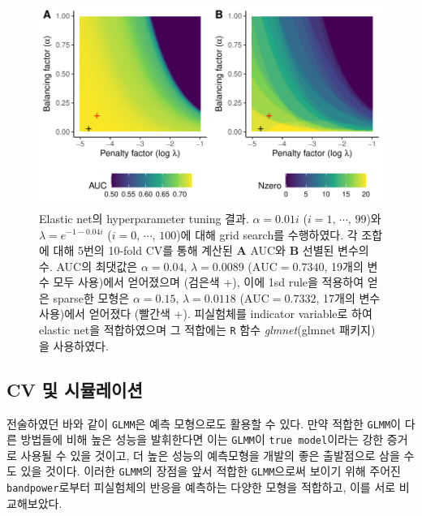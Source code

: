 \documentclass[10pt,onecolumn,twoside,a4size]{gsag3jnl}
\begin{document}
\begin{figure}[tp]
  \renewcommand{\familydefault}{\sfdefault}\normalfont
  \centering
  \includegraphics[width=0.7\linewidth]{Enet.pdf}
  \caption{\small Elastic net의 hyperparameter tuning 결과. $\alpha=0.01i$ ($i=1,\,\cdots,\,99$)와 $\lambda=e^{-1-0.04i}$ ($i=0,\,\cdots,\,100$)에 대해 grid search를 수행하였다. 각 조합에 대해 5번의 10-fold CV를 통해 계산된 \textbf{A} AUC와 \textbf{B} 선별된 변수의 수. AUC의 최댓값은 $\alpha=0.04,\,\lambda=0.0089$ ($\mathrm{AUC}=0.7340$, 19개의 변수 모두 사용)에서 얻어졌으며 (검은색 +), 이에 1sd rule을 적용하여 얻은 sparse한 모형은 $\alpha=0.15,\,\lambda=0.0118$ ($\mathrm{AUC}=0.7332$, 17개의 변수 사용)에서 얻어졌다 (빨간색 +). 피실험체를 indicator variable로 하여 elastic net을 적합하였으며 그 적합에는 \texttt{R} 함수 \textrm{\textit{glmnet}}(glmnet 패키지)을 사용하였다.}
  \label{fig:e_net_tuning}
\end{figure}

\subsection{CV 및 시뮬레이션}

전술하였던 바와 같이 \texttt{GLMM}은 예측 모형으로도 활용할 수 있다. 만약 적합한 \texttt{GLMM}이 다른 방법들에 비해 높은 성능을 발휘한다면 이는 \texttt{GLMM}이 \texttt{true model}이라는 강한 증거로 사용될 수 있을 것이고, 더 높은 성능의 예측모형을 개발의 좋은 출발점으로 삼을 수도 있을 것이다. 이러한 \texttt{GLMM}의 장점을 앞서 적합한 \texttt{GLMM}으로써 보이기 위해 주어진 \texttt{bandpower}로부터 피실험체의 반응을 예측하는 다양한 모형을 적합하고, 이를 서로 비교해보았다.
\end{document}
